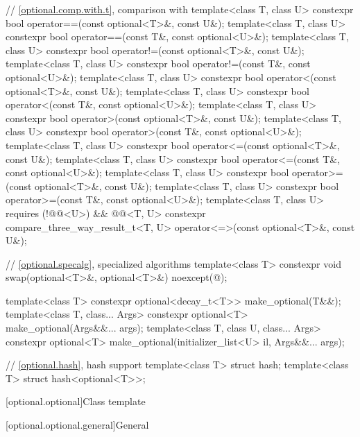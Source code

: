 \begin{codeblock}
{  // \ref{optional.comp.with.t}, comparison with 
  template<class T, class U> constexpr bool operator==(const optional<T>&, const U&);
  template<class T, class U> constexpr bool operator==(const T&, const optional<U>&);
  template<class T, class U> constexpr bool operator!=(const optional<T>&, const U&);
  template<class T, class U> constexpr bool operator!=(const T&, const optional<U>&);
  template<class T, class U> constexpr bool operator<(const optional<T>&, const U&);
  template<class T, class U> constexpr bool operator<(const T&, const optional<U>&);
  template<class T, class U> constexpr bool operator>(const optional<T>&, const U&);
  template<class T, class U> constexpr bool operator>(const T&, const optional<U>&);
  template<class T, class U> constexpr bool operator<=(const optional<T>&, const U&);
  template<class T, class U> constexpr bool operator<=(const T&, const optional<U>&);
  template<class T, class U> constexpr bool operator>=(const optional<T>&, const U&);
  template<class T, class U> constexpr bool operator>=(const T&, const optional<U>&);
  template<class T, class U>
      requires (!@@<U>) && @@<T, U>
    constexpr compare_three_way_result_t<T, U>
      operator<=>(const optional<T>&, const U&);

  // \ref{optional.specalg}, specialized algorithms
  template<class T>
    constexpr void swap(optional<T>&, optional<T>&) noexcept(@\seebelow@);

  template<class T>
    constexpr optional<decay_t<T>> make_optional(T&&);
  template<class T, class... Args>
    constexpr optional<T> make_optional(Args&&... args);
  template<class T, class U, class... Args>
    constexpr optional<T> make_optional(initializer_list<U> il, Args&&... args);

  // \ref{optional.hash}, hash support
  template<class T> struct hash;
  template<class T> struct hash<optional<T>>;
}
\end{codeblock}

[optional.optional]{Class template }

[optional.optional.general]{General}

